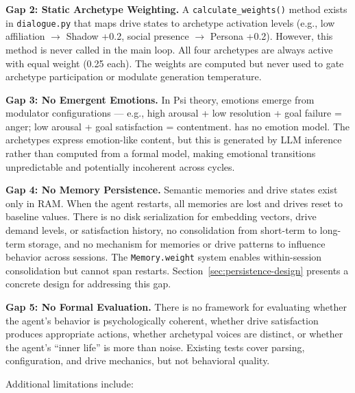 \documentclass[11pt,oneside]{article}
\begin{document}
\begin{gapbox}
\textbf{Gap 2: Static Archetype Weighting.}
A \texttt{calculate\_weights()} method exists in \texttt{dialogue.py} that maps drive states to archetype activation levels (e.g., low affiliation $\to$ Shadow +0.2, social presence $\to$ Persona +0.2).
However, this method is never called in the main loop.
All four archetypes are always active with equal weight (0.25 each).
The weights are computed but never used to gate archetype participation or modulate generation temperature.
\end{gapbox}

\begin{gapbox}
\textbf{Gap 3: No Emergent Emotions.}
In Psi theory, emotions emerge from modulator configurations --- e.g., high arousal + low resolution + goal failure = anger; low arousal + goal satisfaction = contentment.
\sociopsi{} has no emotion model.
The archetypes express emotion-like content, but this is generated by LLM inference rather than computed from a formal model, making emotional transitions unpredictable and potentially incoherent across cycles.
\end{gapbox}

\begin{gapbox}
\textbf{Gap 4: No Memory Persistence.}
Semantic memories and drive states exist only in RAM.
When the agent restarts, all memories are lost and drives reset to baseline values.
There is no disk serialization for embedding vectors, drive demand levels, or satisfaction history, no consolidation from short-term to long-term storage, and no mechanism for memories or drive patterns to influence behavior across sessions.
The \texttt{Memory.weight} system enables within-session consolidation but cannot span restarts.
Section~\ref{sec:persistence-design} presents a concrete design for addressing this gap.
\end{gapbox}

\begin{gapbox}
\textbf{Gap 5: No Formal Evaluation.}
There is no framework for evaluating whether the agent's behavior is psychologically coherent, whether drive satisfaction produces appropriate actions, whether archetypal voices are distinct, or whether the agent's ``inner life'' is more than noise.
Existing tests cover parsing, configuration, and drive mechanics, but not behavioral quality.
\end{gapbox}

Additional limitations include:
\end{document}
